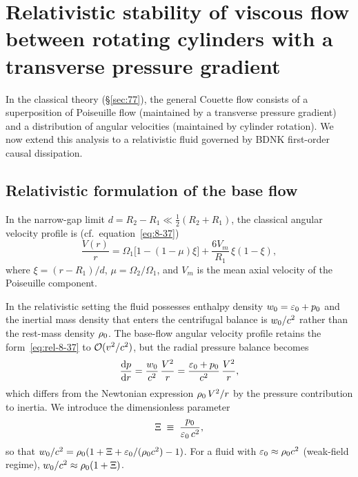 %

\section{Relativistic stability of viscous flow between rotating cylinders
  with a transverse pressure gradient}
\label{sec:rel-77}

In the classical theory (\S\ref{sec:77}), the general Couette flow
consists of a superposition of Poiseuille flow (maintained by a
transverse pressure gradient) and a distribution of angular velocities
(maintained by cylinder rotation).  We now extend this analysis to a
relativistic fluid governed by BDNK first-order causal dissipation.

\subsection{Relativistic formulation of the base flow}
\label{sec:rel-77-base}

In the narrow-gap limit $d = R_2 - R_1 \ll \tfrac{1}{2}(R_2 + R_1)$,
the classical angular velocity profile is (cf.\ equation~\eqref{eq:8-37})
\begin{equation}
\label{eq:rel-8-37}
\frac{V(r)}{r} = \Omega_1\bigl[1 - (1-\mu)\xi\bigr]
  + \frac{6 V_m}{R_1}\,\xi(1-\xi),
\end{equation}
where $\xi = (r - R_1)/d$, $\mu = \Omega_2/\Omega_1$, and $V_m$ is
the mean axial velocity of the Poiseuille component.

In the relativistic setting the fluid possesses enthalpy density
$w_0 = \varepsilon_0 + p_0$ and the inertial mass density
that enters the centrifugal balance is $w_0/c^2$ rather
than the rest-mass density $\rho_0$.  The base-flow angular
velocity profile retains the form~\eqref{eq:rel-8-37} to
$\mathcal{O}(v^2/c^2)$, but the radial pressure balance becomes
\begin{equation}
\label{eq:rel-8-centrifugal}
\frac{\mathrm{d} p}{\mathrm{d} r}
  = \frac{w_0}{c^2}\,\frac{V^2}{r}
  = \frac{\varepsilon_0 + p_0}{c^2}\,\frac{V^2}{r},
\end{equation}
which differs from the Newtonian expression $\rho_0\, V^2/r$ by
the pressure contribution to inertia.  We introduce the dimensionless
parameter
\begin{equation}
\label{eq:rel-8-Xi}
\Xi \;\equiv\; \frac{p_0}{\varepsilon_0\,c^2},
\end{equation}
so that $w_0/c^2 = \rho_0(1 + \Xi + \varepsilon_0/(\rho_0 c^2) - 1)$.
For a fluid with $\varepsilon_0 \approx \rho_0 c^2$ (weak-field regime),
$w_0/c^2 \approx \rho_0(1 + \Xi)$.

